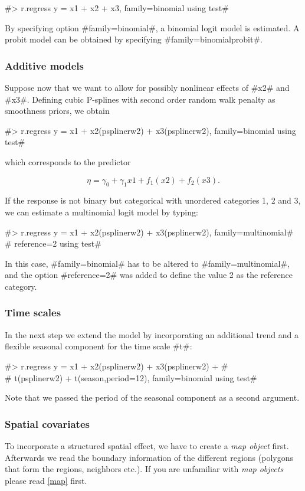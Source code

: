 #> r.regress y = x1 + x2 + x3, family=binomial using test#

By specifying option #family=binomial#, a binomial logit model is
estimated. A probit model can be obtained by specifying
#family=binomialprobit#.

\subsubsection*{Additive models}

Suppose now that we want to allow for possibly nonlinear effects
of #x2# and #x3#. Defining cubic P-splines with second order
random walk penalty as smoothness priors, we obtain

 #> r.regress y = x1 + x2(psplinerw2) + x3(psplinerw2), family=binomial using test#

which corresponds to the predictor

$$
\eta = \gamma_0 + \gamma_1 x1 + f_1(x2) + f_2(x3).
$$

If the response is not binary but categorical with unordered
categories 1, 2 and 3, we can estimate a multinomial logit model by
typing:

 #> r.regress y = x1 + x2(psplinerw2) + x3(psplinerw2), family=multinomial#\\
 #  reference=2 using test#

In this case, #family=binomial# has to be altered to
#family=multinomial#, and the option #reference=2# was added to
define the value 2 as the reference category.

\subsubsection*{Time scales}

In the next step we extend the model by incorporating an additional
trend and a flexible seasonal component for the time scale #t#:

 #> r.regress y = x1 + x2(psplinerw2) + x3(psplinerw2) +  #\\
 #  t(psplinerw2) + t(season,period=12), family=binomial using test#

Note that we passed the period of the seasonal component as a
second argument.

\subsubsection*{Spatial covariates}

To incorporate a structured spatial effect, we have to create a {\em
map object} first. Afterwards we read the boundary information of
the different regions (polygons that form the regions, neighbors
etc.). If you are unfamiliar with {\em map objects} please read
\autoref{map} first.

